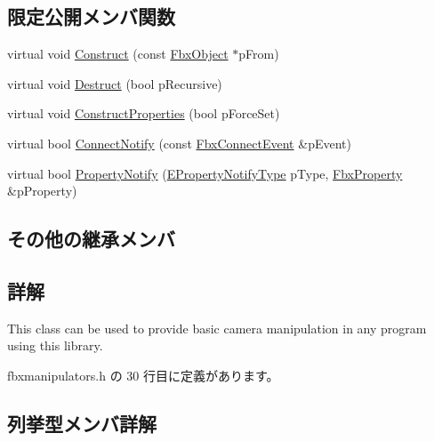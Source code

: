 \subsection*{限定公開メンバ関数}
\begin{DoxyCompactItemize}
\item 
virtual void \hyperlink{class_fbx_camera_manipulator_ac85c39bca662da17932613bd8bbaf95b}{Construct} (const \hyperlink{class_fbx_object}{Fbx\+Object} $\ast$p\+From)
\item 
virtual void \hyperlink{class_fbx_camera_manipulator_aba0217b5fd302152dc0e2726ca3c325a}{Destruct} (bool p\+Recursive)
\item 
virtual void \hyperlink{class_fbx_camera_manipulator_a9e97c5d7f153bbc80a2c233d425a447f}{Construct\+Properties} (bool p\+Force\+Set)
\item 
virtual bool \hyperlink{class_fbx_camera_manipulator_a0cd75ec4a78ef84f2cf10f750e4491c6}{Connect\+Notify} (const \hyperlink{class_fbx_connect_event}{Fbx\+Connect\+Event} \&p\+Event)
\item 
virtual bool \hyperlink{class_fbx_camera_manipulator_aa0b1cdb3a150798e03587a3adeadd87a}{Property\+Notify} (\hyperlink{class_fbx_object_a528f1b2c2b7abbd64c525ba3a9a496b8}{E\+Property\+Notify\+Type} p\+Type, \hyperlink{class_fbx_property}{Fbx\+Property} \&p\+Property)
\end{DoxyCompactItemize}
\subsection*{その他の継承メンバ}


\subsection{詳解}
This class can be used to provide basic camera manipulation in any program using this library. 

 fbxmanipulators.\+h の 30 行目に定義があります。



\subsection{列挙型メンバ詳解}
\mbox{\label{class_fbx_camera_manipulator_ada0f93888edb4a1c0140e35f99eba922}} 
